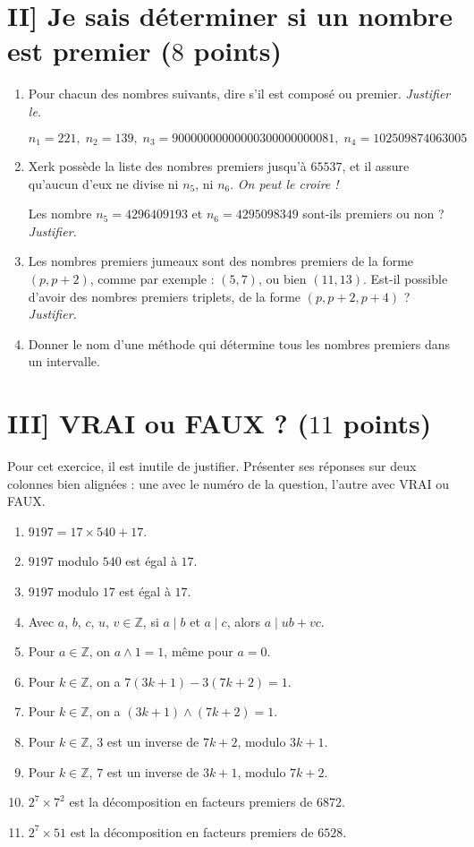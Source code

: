 \documentclass[12pt,a4paper]{article}
\begin{document}
\section*{II] Je sais déterminer si un nombre est premier ($8$ points)}
\begin{enumerate}
\item Pour chacun des nombres suivants, dire s'il est composé ou premier.
 \emph{Justifier le.}
 
 $$n_1 = 221,\; n_2=139,\; n_3=\num{90000000000000300000000081}, \;n_4 = \num{102509874063005}$$

\item Xerk possède la liste des nombres premiers jusqu'à $65537$, et il assure qu'aucun d'eux ne divise ni $n_5$, ni $n_6$. \emph{On peut le croire !}

Les nombre $n_5 = \num{4296409193}$ et $n_6=4295098349$ sont-ils premiers ou non ? \emph{Justifier.}

\item Les nombres premiers jumeaux sont des nombres premiers de la forme $(p, p+2)$, comme par exemple : $(5, 7)$, ou bien $(11, 13)$. Est-il possible d'avoir des nombres premiers triplets, de la forme $(p, p+2, p+4)$ ? \emph{Justifier.}

\item Donner le nom d'une méthode qui détermine tous les nombres premiers dans un intervalle.
\end{enumerate}

\section*{III] VRAI ou FAUX ? ($11$ points)}
Pour cet exercice, il est inutile de justifier. Présenter ses réponses sur deux colonnes bien alignées : une avec le numéro de la question, l'autre avec VRAI ou FAUX.
\begin{enumerate}
\item $9197 = 17\times540 + 17$.
\item $9197$ modulo $540$ est égal à $17$.
\item $9197$ modulo $17$ est égal à $17$.
\item Avec $a$, $b$, $c$, $u$, $v\in \mathbb{Z}$, si $a\mid b$ et $a\mid c$, alors $a\mid ub+vc$.
\item Pour $a\in \mathbb{Z}$, on $a\land 1 = 1$, même pour $a=0$.
\item Pour $k\in \mathbb{Z}$, on a $7(3k+1) - 3(7k+2)=1$.
\item Pour $k\in \mathbb{Z}$, on a $(3k+1) \land (7k+2)=1$.
\item Pour $k\in \mathbb{Z}$, $3$ est un inverse de $7k+2$, modulo $3k+1$.
\item Pour $k\in \mathbb{Z}$, $7$ est un inverse de $3k+1$, modulo $7k+2$.
\item $2^7\times 7^2$ est la décomposition en facteurs premiers de $6872$.
\item $2^7\times 51$ est la décomposition en facteurs premiers de $6528$.
\end{enumerate}
\end{document}
